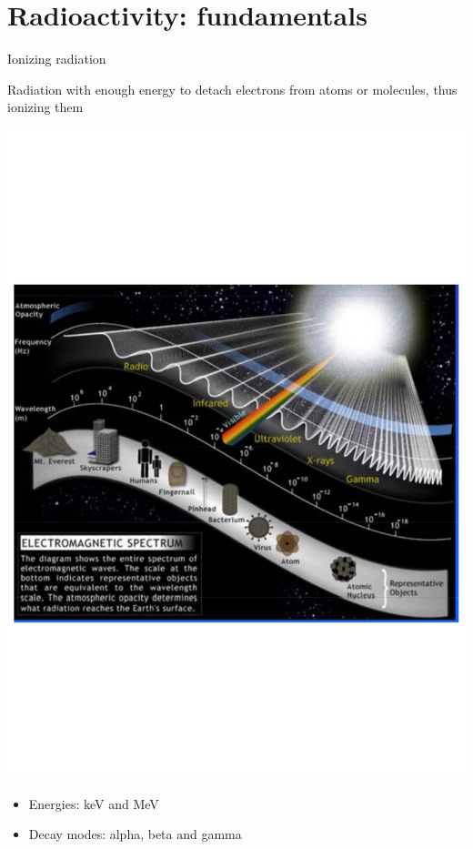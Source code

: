\section{Radioactivity: fundamentals}


\begin{frame}{Ionizing radiation}

\alert{Radiation with enough energy to detach electrons from atoms or molecules, thus ionizing them}

\pause
\vskip-2cm
\centering
\includegraphics[scale=0.3]{figures/20160218_rsw_emspectrum.pdf}

\vskip-2cm
\begin{itemize}
\item Energies: keV and MeV
\item Decay modes: alpha, beta and gamma
\end{itemize}

\end{frame}

